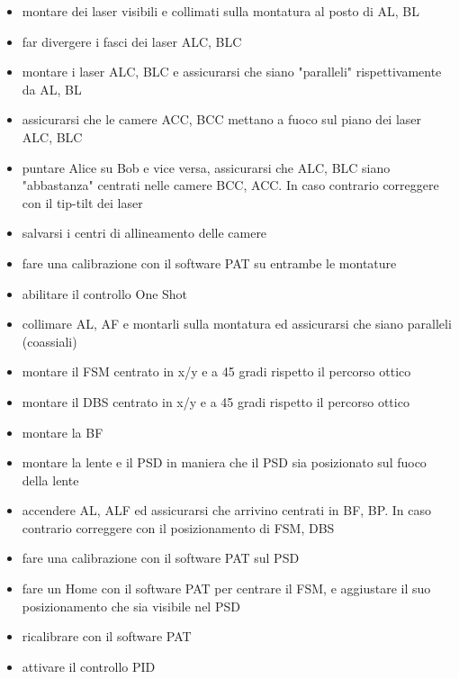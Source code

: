 \begin{itemize}
  \item montare dei laser visibili e collimati sulla montatura al posto di AL, BL
  \item far divergere i fasci dei laser ALC, BLC
  \item montare i laser ALC, BLC e assicurarsi che siano "paralleli" rispettivamente da AL, BL
  \item assicurarsi che le camere ACC, BCC mettano a fuoco sul piano dei laser ALC, BLC
  \item puntare Alice su Bob e vice versa, assicurarsi che ALC, BLC siano "abbastanza" centrati nelle camere BCC, ACC. In caso contrario correggere con il tip-tilt dei laser
  \item salvarsi i centri di allineamento delle camere
  \item fare una calibrazione con il software PAT su entrambe le montature
  \item abilitare il controllo One Shot
\end{itemize}

\begin{itemize}
  \item collimare AL, AF e montarli sulla montatura ed assicurarsi che siano paralleli (coassiali)
  \item montare il FSM centrato in x/y e a 45 gradi rispetto il percorso ottico
  \item montare il DBS centrato in x/y e a 45 gradi rispetto il percorso ottico
  \item montare la BF
  \item montare la lente e il PSD in maniera che il PSD sia posizionato sul fuoco della lente
  \item accendere AL, ALF ed assicurarsi che arrivino centrati in BF, BP. In caso contrario correggere con il posizionamento di FSM, DBS
  \item fare una calibrazione con il software PAT sul PSD
  \item fare un Home con il software PAT per centrare il FSM, e aggiustare il suo posizionamento che sia visibile nel PSD
  \item ricalibrare con il software PAT
  \item attivare il controllo PID
\end{itemize}

